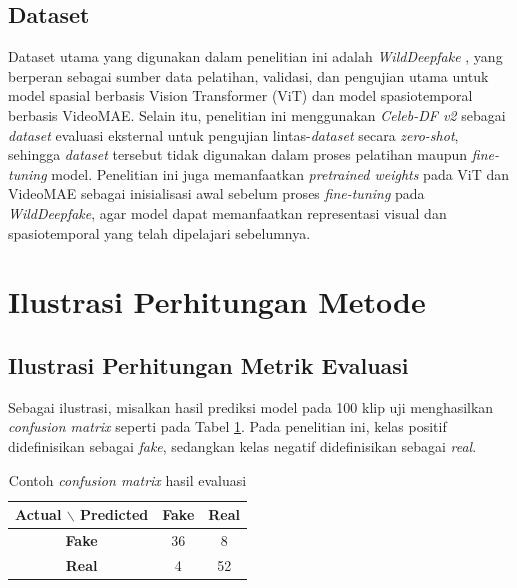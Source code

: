 \subsection{Dataset} \label{III.Dataset}
Dataset utama yang digunakan dalam penelitian ini adalah \textit{WildDeepfake} \cite{Zi2024,wilddeepfake_hf}, yang berperan sebagai sumber data pelatihan, validasi, dan pengujian utama untuk model spasial berbasis Vision Transformer (ViT) dan model spasiotemporal berbasis VideoMAE. Selain itu, penelitian ini menggunakan \textit{Celeb-DF v2} \cite{li2020celebdflargescalechallengingdataset,celebdfv2_kaggle} sebagai \textit{dataset} evaluasi eksternal untuk pengujian lintas-\textit{dataset} secara \textit{zero-shot}, sehingga \textit{dataset} tersebut tidak digunakan dalam proses pelatihan maupun \textit{fine-tuning} model. Penelitian ini juga memanfaatkan \textit{pretrained weights} pada ViT dan VideoMAE sebagai inisialisasi awal sebelum proses \textit{fine-tuning} pada \textit{WildDeepfake}, agar model dapat memanfaatkan representasi visual dan spasiotemporal yang telah dipelajari sebelumnya. \par

\section{Ilustrasi Perhitungan Metode} \label{III.Ilustrasi}

\subsection{Ilustrasi Perhitungan Metrik Evaluasi}
Sebagai ilustrasi, misalkan hasil prediksi model pada 100 klip uji menghasilkan \textit{confusion matrix} seperti pada Tabel \ref{tab:3.contoh-confusion-matrix}. Pada penelitian ini, kelas positif didefinisikan sebagai \textit{fake}, sedangkan kelas negatif didefinisikan sebagai \textit{real}. \par

\begin{table}[H]
	\centering
	\caption{Contoh \textit{confusion matrix} hasil evaluasi}
	\label{tab:3.contoh-confusion-matrix}
	\begin{tabular}{|c|c|c|}
		\hline
		\textbf{Actual $\backslash$ Predicted} & \textbf{Fake} & \textbf{Real} \\
		\hline
		\textbf{Fake} & 36 & 8 \\
		\hline
		\textbf{Real} & 4 & 52 \\
		\hline
	\end{tabular}
\end{table}
\par

